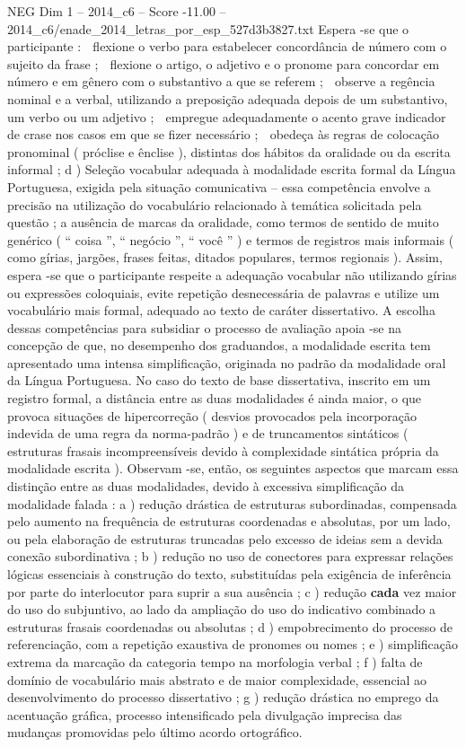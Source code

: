 \begin{textsample}{NEG Dim 1 – 2014\_c6 – Score -11.00 – 2014\_c6/enade\_2014\_letras\_por\_esp\_527d3b3827.txt}
Espera -se que o participante :  flexione o verbo para estabelecer concordância de número com o sujeito da frase ;  flexione o artigo, o adjetivo e o pronome para concordar em número e em gênero com o substantivo a que se referem ;  observe a regência nominal e a verbal, utilizando a preposição adequada depois de um substantivo, um verbo ou um adjetivo ;  empregue adequadamente o acento grave indicador de crase nos casos em que se fizer necessário ;  obedeça às regras de colocação pronominal ( próclise e ênclise ), distintas dos hábitos da oralidade ou da escrita informal ; d ) Seleção vocabular adequada à modalidade escrita formal da Língua Portuguesa, exigida pela situação comunicativa – essa competência envolve a precisão na utilização do vocabulário relacionado à temática solicitada pela questão ; a ausência de marcas da oralidade, como termos de sentido de muito genérico ( “ coisa ”, “ negócio ”, “ você ” ) e termos de registros mais informais ( como gírias, jargões, frases feitas, ditados populares, termos regionais ).
Assim, espera -se que o participante respeite a adequação vocabular não utilizando gírias ou expressões coloquiais, evite repetição desnecessária de palavras e utilize um vocabulário mais formal, adequado ao texto de caráter dissertativo.
A escolha dessas competências para subsidiar o processo de avaliação apoia -se na concepção de que, no desempenho dos graduandos, a modalidade escrita tem apresentado uma intensa simplificação, originada no padrão da modalidade oral da Língua Portuguesa.
No caso do texto de base dissertativa, inscrito em um registro formal, a distância entre as duas modalidades é ainda maior, o que provoca situações de hipercorreção ( desvios provocados pela incorporação indevida de uma regra da norma-padrão ) e de truncamentos sintáticos ( estruturas frasais incompreensíveis devido à complexidade sintática própria da modalidade escrita ).
Observam -se, então, os seguintes aspectos que marcam essa distinção entre as duas modalidades, devido à excessiva simplificação da modalidade falada : a ) redução drástica de estruturas subordinadas, compensada pelo aumento na frequência de estruturas coordenadas e absolutas, por um lado, ou pela elaboração de estruturas truncadas pelo excesso de ideias sem a devida conexão subordinativa ; b ) redução no uso de conectores para expressar relações lógicas essenciais à construção do texto, substituídas pela exigência de inferência por parte do interlocutor para suprir a sua ausência ; c ) redução \textbf{cada} vez maior do uso do subjuntivo, ao lado da ampliação do uso do indicativo combinado a estruturas frasais coordenadas ou absolutas ; d ) empobrecimento do processo de referenciação, com a repetição exaustiva de pronomes ou nomes ; e ) simplificação extrema da marcação da categoria tempo na morfologia verbal ; f ) falta de domínio de vocabulário mais abstrato e de maior complexidade, essencial ao desenvolvimento do processo dissertativo ; g ) redução drástica no emprego da acentuação gráfica, processo intensificado pela divulgação imprecisa das mudanças promovidas pelo último acordo ortográfico.

\end{textsample}
